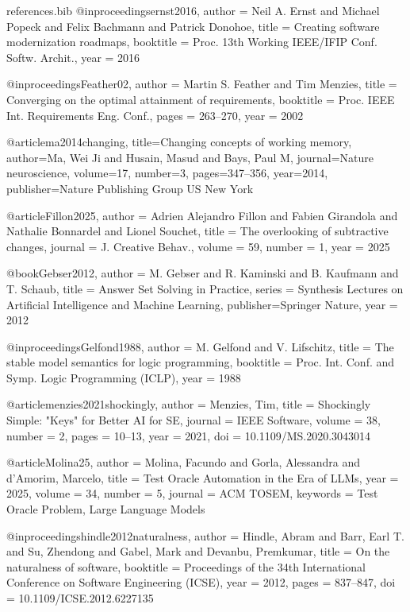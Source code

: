 \documentclass[pdflatex,sn-basic]{sn-jnl}
\begin{document}
\begin{filecontents}{references.bib}
@inproceedings{ernst2016,
  author    = {Neil A. Ernst and Michael Popeck and Felix Bachmann and Patrick Donohoe},
  title     = {Creating software modernization roadmaps},
  booktitle = {Proc. 13th Working IEEE/IFIP Conf. Softw. Archit.},
  year      = {2016}
}



@inproceedings{Feather02,
  author    = {Martin S. Feather and Tim Menzies},
  title     = {Converging on the optimal attainment of requirements},
  booktitle = {Proc. IEEE Int. Requirements Eng. Conf.},
  pages     = {263--270},
  year      = {2002}
}


@article{ma2014changing,
  title={Changing concepts of working memory},
  author={Ma, Wei Ji and Husain, Masud and Bays, Paul M},
  journal={Nature neuroscience},
  volume={17},
  number={3},
  pages={347--356},
  year={2014},
  publisher={Nature Publishing Group US New York}
}


@article{Fillon2025,
  author  = {Adrien Alejandro Fillon and Fabien Girandola and Nathalie Bonnardel and Lionel Souchet},
  title   = {The overlooking of subtractive changes},
  journal = {J. Creative Behav.},
  volume  = {59},
  number  = {1},
  year    = {2025}
}



@book{Gebser2012,
  author    = {M. Gebser and R. Kaminski and B. Kaufmann and T. Schaub},
  title     = {Answer Set Solving in Practice},
  series    = {Synthesis Lectures on Artificial Intelligence and Machine Learning},
  publisher={Springer Nature},
  year      = {2012}
}


@inproceedings{Gelfond1988,
  author    = {M. Gelfond and V. Lifschitz},
  title     = {The stable model semantics for logic programming},
  booktitle = {Proc. Int. Conf. and Symp. Logic Programming (ICLP)},
  year      = {1988}
}


@article{menzies2021shockingly,
  author = {Menzies, Tim},
  title = {Shockingly Simple: "Keys" for Better {AI} for {SE}},
  journal = {IEEE Software},
  volume = {38},
  number = {2},
  pages = {10--13},
  year = {2021},
  doi = {10.1109/MS.2020.3043014}
}

@article{Molina25,
author = {Molina, Facundo and Gorla, Alessandra and d’Amorim, Marcelo},
title = {Test Oracle Automation in the Era of LLMs},
year = {2025}, 
volume = {34},
number = {5},
journal = {ACM TOSEM},  
keywords = {Test Oracle Problem, Large Language Models}
}


@inproceedings{hindle2012naturalness,
  author = {Hindle, Abram and Barr, Earl T. and Su, Zhendong and Gabel, Mark and Devanbu, Premkumar},
  title = {On the naturalness of software},
  booktitle = {Proceedings of the 34th International Conference on Software Engineering (ICSE)},
  year = {2012},
  pages = {837--847},
  doi = {10.1109/ICSE.2012.6227135}
}


\end{filecontents}
\end{document}
